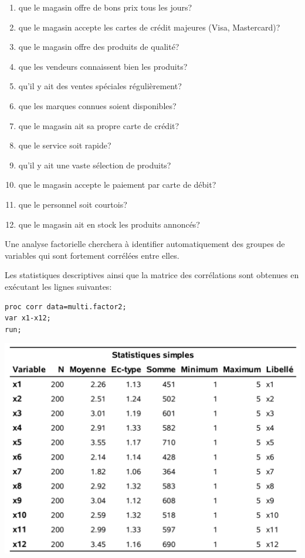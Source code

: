 \documentclass[
  11pt,
  letterpaper,
]{book}
\providecommand{\tightlist}{%
  \setlength{\itemsep}{0pt}\setlength{\parskip}{0pt}}
\theoremstyle{definition}
\theoremstyle{definition}
\theoremstyle{definition}
\theoremstyle{remark}
\begin{document}
\begin{enumerate}
\def\labelenumi{\arabic{enumi}.}
\tightlist
\item
  que le magasin offre de bons prix tous les jours?
\item
  que le magasin accepte les cartes de crédit majeures (Visa, Mastercard)?
\item
  que le magasin offre des produits de qualité?
\item
  que les vendeurs connaissent bien les produits?
\item
  qu'il y ait des ventes spéciales régulièrement?
\item
  que les marques connues soient disponibles?
\item
  que le magasin ait sa propre carte de crédit?
\item
  que le service soit rapide?
\item
  qu'il y ait une vaste sélection de produits?
\item
  que le magasin accepte le paiement par carte de débit?
\item
  que le personnel soit courtois?
\item
  que le magasin ait en stock les produits annoncés?
\end{enumerate}

Une analyse factorielle cherchera à identifier automatiquement des groupes de variables qui sont fortement corrélées entre elles.

Les statistiques descriptives ainsi que la matrice des corrélations sont obtenues en exécutant les lignes suivantes:

\begin{verbatim}
proc corr data=multi.factor2;
var x1-x12;
run;
\end{verbatim}

\begin{center}\includegraphics[width=0.9\linewidth]{figures/01-facto-e1} \end{center}
\end{document}
